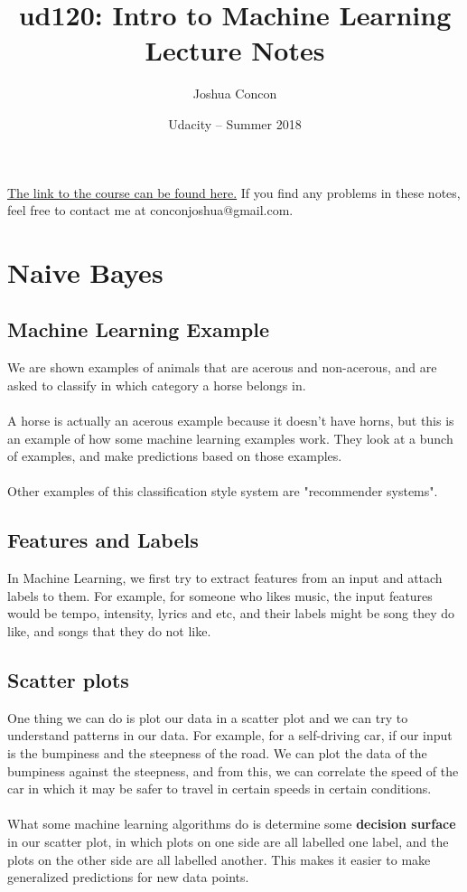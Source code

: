 \documentclass[12pt]{article}
\begin{document}
  \title{ud120: Intro to Machine Learning\\ Lecture Notes}
  \date{Udacity -- Summer 2018}
  \author{Joshua Concon}
  \maketitle
  \href{https://classroom.udacity.com/courses/ud120}{The link to the course can be found here.} If you find any problems in these notes, feel free to contact me at conconjoshua@gmail.com.

  \tableofcontents

  \pagebreak

  \section{Naive Bayes}

  \subsection{Machine Learning Example}

  We are shown examples of animals that are acerous and non-acerous, and are asked to classify in which category a horse belongs in.\\
  \\
  A horse is actually an acerous example because it doesn't have horns, but this is an example of how some machine learning examples work. They look at a bunch of examples, and make predictions based on those examples.\\
  \\
  Other examples of this classification style system are "recommender systems".

  \subsection{Features and Labels}

  In Machine Learning, we first try to extract features from an input and attach labels to them. For example, for someone who likes music, the input features would be tempo, intensity, lyrics and etc, and their labels might be song they do like, and songs that they do not like.

  \subsection{Scatter plots}

  One thing we can do is plot our data in a scatter plot and we can try to understand patterns in our data. For example, for a self-driving car, if our input is the bumpiness and the steepness of the road. We can plot the data of the bumpiness against the steepness, and from this, we can correlate the speed of the car in which it may be safer to travel in certain speeds in certain conditions.\\
  \\
  What some machine learning algorithms do is determine some \textbf{decision surface} in our scatter plot, in which plots on one side are all labelled one label, and the plots on the other side are all labelled another. This makes it easier to make generalized predictions for new data points.
\end{document}
